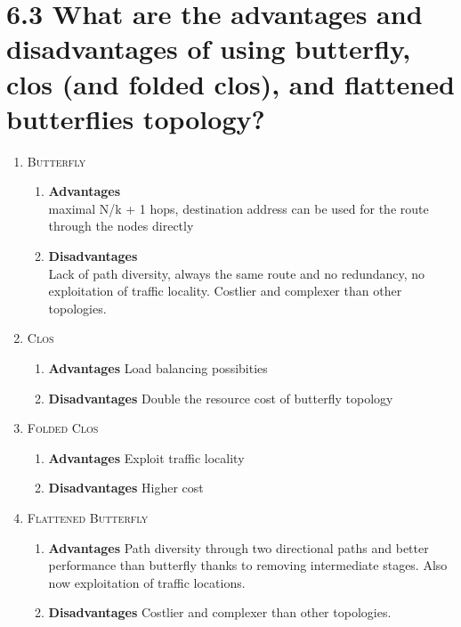 \documentclass{article}
\begin{document}
	\section*{6.3 What are the advantages and disadvantages of using butterfly, clos (and folded clos), and flattened butterflies topology?}
	\begin{adjustwidth}{2em}{2em}
		\begin{enumerate}[\small \textbullet]
			\item \textsc{Butterfly}
			\begin{enumerate}[-]
				\item \textbf{Advantages} \\
				maximal N/k + 1 hops, destination address can be used for the route through the nodes directly
				\item \textbf{Disadvantages} \\
				Lack of path diversity, always the same route and no redundancy, no exploitation of traffic locality. Costlier and complexer than other topologies.
			\end{enumerate}
			\item \textsc{Clos}
			\begin{enumerate}[-]
				\item \textbf{Advantages}
				Load balancing possibities
				\item \textbf{Disadvantages}
				Double the resource cost of butterfly topology
			\end{enumerate}
			\item \textsc{Folded Clos}
			\begin{enumerate}[-]
				\item \textbf{Advantages}
				Exploit traffic locality
				\item \textbf{Disadvantages}
				Higher cost
			\end{enumerate}
			\item \textsc{Flattened Butterfly}
			\begin{enumerate}[-]
				\item \textbf{Advantages}
				Path diversity through two directional paths and better performance than butterfly thanks to removing intermediate stages. Also now exploitation of traffic locations.
				\item \textbf{Disadvantages}
				Costlier and complexer than other topologies.
			\end{enumerate}
		\end{enumerate}
	\end{adjustwidth}
	
\end{document}
